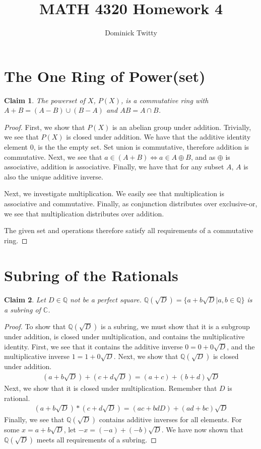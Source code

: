 \documentclass[12pt]{article}
\newtheorem*{claim*}{Claim}
\begin{document}
\title{MATH 4320 Homework 4}
\author{Dominick Twitty}
\date{}
\maketitle

\section{The One Ring of Power(set)}
\begin{claim*}
The powerset of $X$, $P(X)$, is a commutative ring with $A + B = (A - B) \cup (B - A)$ and $AB = A \cap B$.
\end{claim*}
\begin{proof}
First, we show that $P(X)$ is an abelian group under addition. Trivially, we see that $P(X)$ is closed under addition. We have that the additive identity element $0$, is the the empty set. Set union is commutative, therefore addition is commutative. Next, we see that $a \in (A + B) \iff a \in A \oplus B$, and as $\oplus$ is associative, addition is associative. Finally, we have that for any subset $A$, $A$ is also the unique additive inverse.

Next, we investigate multiplication. We easily see that multiplication is associative and commutative. Finally, as conjunction distributes over exclusive-or, we see that multiplication distributes over addition.

The given set and operations therefore satisfy all requirements of a commutative ring.
\end{proof}

\section{Subring of the Rationals}
\begin{claim*}
Let $D \in \mathbb{Q}$ not be a perfect square. $\mathbb{Q}(\sqrt{D}) = \{a + b\sqrt{D} | a, b \in \mathbb{Q}\}$ is a subring of $\mathbb{C}$.
\end{claim*}
\begin{proof}
To show that $\mathbb{Q}(\sqrt{D})$ is a subring, we must show that it is a subgroup under addition, is closed under multiplication, and contains the multiplicative identity. First, we see that it contains the additive inverse $0 = 0 + 0\sqrt{D}$, and the multiplicative inverse $1 = 1 + 0\sqrt{D}$. Next, we show that $\mathbb{Q}(\sqrt{D})$ is closed under addition.
\begin{align*}
(a + b\sqrt{D}) + (c + d\sqrt{D}) = (a + c) + (b + d)\sqrt{D}
\end{align*}
Next, we show that it is closed under multiplication. Remember that $D$ is rational.
\begin{align*}
(a + b\sqrt{D}) * (c + d\sqrt{D}) = (ac + bdD) + (ad + bc)\sqrt{D}
\end{align*}
Finally, we see that $\mathbb{Q}(\sqrt{D})$ contains additive inverses for all elements. For some $x = a + b\sqrt{D}$, let $-x = (-a) + (-b)\sqrt{D}$. We have now shown that $\mathbb{Q}(\sqrt{D})$ meets all requirements of a subring.
\end{proof}
\end{document}
